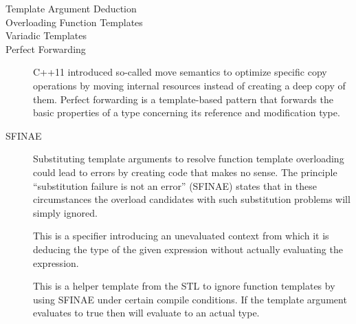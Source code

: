 \documentclass{stdlocal}
\begin{document}
    \begin{description}
      \item[Template Argument Deduction]
      \item[Overloading Function Templates]
      \item[Variadic Templates]
      \item[Perfect Forwarding]
        C++11 introduced so-called move semantics to optimize specific copy operations by moving internal resources instead of creating a deep copy of them.
        Perfect forwarding is a template-based pattern that forwards the basic properties of a type concerning its reference and modification type.
      \item[SFINAE]
        Substituting template arguments to resolve function template overloading could lead to errors by creating code that makes no sense.
        The principle \enquote{substitution failure is not an error} (SFINAE) states that in these circumstances the overload candidates with such substitution problems will simply ignored.
      \item[]
        This is a specifier introducing an unevaluated context from which it is deducing the type of the given expression without actually evaluating the expression.
      \item[]
        This is a helper template from the STL to ignore function templates by using SFINAE under certain compile conditions.
        If the template argument evaluates to true then  will evaluate to an actual type.

\end{description}
\end{document}
